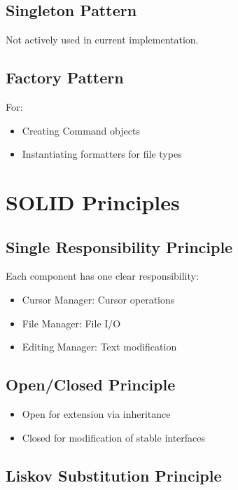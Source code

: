 \documentclass[12pt,a4paper,oneside,openany]{report}
\begin{document}
\subsection{Singleton Pattern}

Not actively used in current implementation.

\subsection{Factory Pattern}

For:

\begin{itemize}
	\item Creating Command objects
	\item Instantiating formatters for file types
\end{itemize}

\section{SOLID Principles}

\subsection{Single Responsibility Principle}

Each component has one clear responsibility:

\begin{itemize}
	\item Cursor Manager: Cursor operations
	\item File Manager: File I/O
	\item Editing Manager: Text modification
\end{itemize}

\subsection{Open/Closed Principle}

\begin{itemize}
	\item Open for extension via inheritance
	\item Closed for modification of stable interfaces
\end{itemize}

\subsection{Liskov Substitution Principle}
\end{document}
